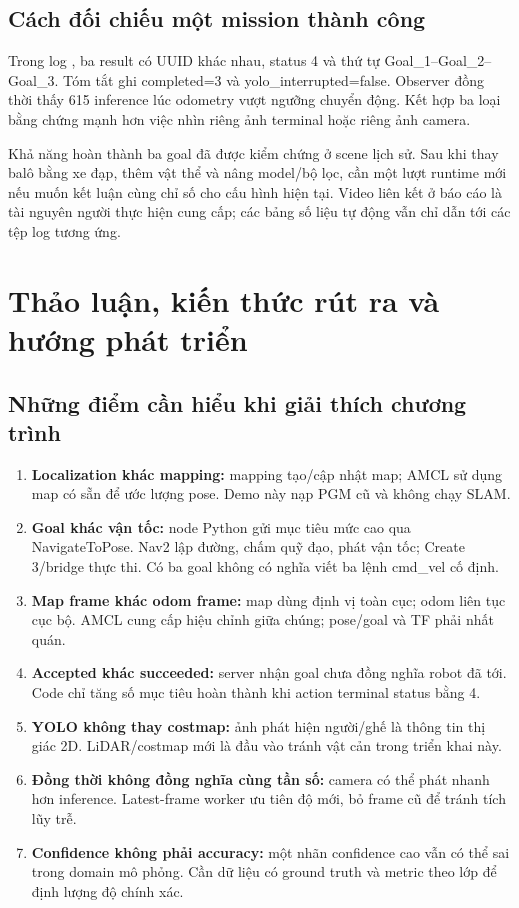 \subsection{Cách đối chiếu một mission thành công}
Trong log , ba result có UUID khác nhau, status 4 và thứ tự Goal\_1--Goal\_2--Goal\_3. Tóm tắt ghi completed=3 và yolo\_interrupted=false. Observer đồng thời thấy 615 inference lúc odometry vượt ngưỡng chuyển động. Kết hợp ba loại bằng chứng mạnh hơn việc nhìn riêng ảnh terminal hoặc riêng ảnh camera.

Khả năng hoàn thành ba goal đã được kiểm chứng ở scene lịch sử. Sau khi thay balô bằng xe đạp, thêm vật thể và nâng model/bộ lọc, cần một lượt runtime mới nếu muốn kết luận cùng chỉ số cho cấu hình hiện tại. Video liên kết ở báo cáo là tài nguyên người thực hiện cung cấp; các bảng số liệu tự động vẫn chỉ dẫn tới các tệp log tương ứng.
\clearpage

\section{Thảo luận, kiến thức rút ra và hướng phát triển}
\subsection{Những điểm cần hiểu khi giải thích chương trình}
\begin{enumerate}
\item \textbf{Localization khác mapping:} mapping tạo/cập nhật map; AMCL sử dụng map có sẵn để ước lượng pose. Demo này nạp PGM cũ và không chạy SLAM.
\item \textbf{Goal khác vận tốc:} node Python gửi mục tiêu mức cao qua NavigateToPose. Nav2 lập đường, chấm quỹ đạo, phát vận tốc; Create 3/bridge thực thi. Có ba goal không có nghĩa viết ba lệnh cmd\_vel cố định.
\item \textbf{Map frame khác odom frame:} map dùng định vị toàn cục; odom liên tục cục bộ. AMCL cung cấp hiệu chỉnh giữa chúng; pose/goal và TF phải nhất quán.
\item \textbf{Accepted khác succeeded:} server nhận goal chưa đồng nghĩa robot đã tới. Code chỉ tăng số mục tiêu hoàn thành khi action terminal status bằng 4.
\item \textbf{YOLO không thay costmap:} ảnh phát hiện người/ghế là thông tin thị giác 2D. LiDAR/costmap mới là đầu vào tránh vật cản trong triển khai này.
\item \textbf{Đồng thời không đồng nghĩa cùng tần số:} camera có thể phát nhanh hơn inference. Latest-frame worker ưu tiên độ mới, bỏ frame cũ để tránh tích lũy trễ.
\item \textbf{Confidence không phải accuracy:} một nhãn confidence cao vẫn có thể sai trong domain mô phỏng. Cần dữ liệu có ground truth và metric theo lớp để định lượng độ chính xác.
\end{enumerate}
